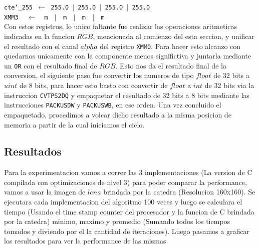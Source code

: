 \noindent
\texttt{cte\char`_255 $\gets$ 255.0 $\vert$ 255.0 $\vert$ 255.0 $\vert$ 255.0}\\
\texttt{XMM3 $\ \ \ \gets\ \ $ m $\ \ \vert\ \ $ m $\ \ \vert\ \ $ m $\ \ \vert\ \ $ m}\\

Con estos registros, lo unico faltante fue realizar las operaciones aritmeticas indicadas en la funcion $RGB$, mencionada al comienzo del esta seccion, y unificar el resultado con el canal $alpha$ del registro \texttt{XMM0}. Para hacer esto alcanzo con quedarnos unicamente con la componente menos significtiva y juntarla mediante un \texttt{OR} con el resultado final de $RGB$. Esto nos da el resultado final de la conversion, el siguiente paso fue convertir los numeros de tipo $float$ de 32 bits a $uint$ de 8 bits, para hacer esto basto con convertir de $float$ a $int$ de 32 bits via la instruccion \texttt{CVTPS2DQ} y empaquetar el resultado de 32 bits a 8 bits mediante las instrucciones \texttt{PACKUSDW} y \texttt{PACKUSWB}, en ese orden. Una vez concluido el empaquetado, procedimos a volcar dicho resultado a la misma posicion de memoria a partir de la cual iniciamos el ciclo.

\subsection{Resultados}
Para la experimentacion vamos a correr las 3 implementaciones (La version de C compilada con optimizaciones de nivel 3) para poder comparar la performance, vamos a usar la imagen de $lena$ brindada por la catedra (Resolucion 160x160). Se ejecutara cada implementacion del algoritmo 100 veces y luego se calculara el tiempo (Usando el time stamp counter del procesador y la funcion de C brindada por la catedra) minimo, maximo y promedio (Sumando todos los tiempos tomados y diviendo por el la cantidad de iteraciones). Luego pasamos a graficar los resultados para ver la performance de las mismas.

